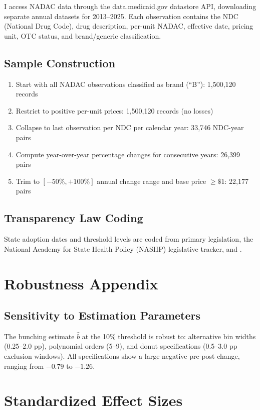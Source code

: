 \documentclass[12pt]{article}
\begin{document}
I access NADAC data through the data.medicaid.gov datastore API, downloading separate annual datasets for 2013--2025. Each observation contains the NDC (National Drug Code), drug description, per-unit NADAC, effective date, pricing unit, OTC status, and brand/generic classification.

\subsection{Sample Construction}

\begin{enumerate}
\item Start with all NADAC observations classified as brand (``B''): 1,500,120 records
\item Restrict to positive per-unit prices: 1,500,120 records (no losses)
\item Collapse to last observation per NDC per calendar year: 33,746 NDC-year pairs
\item Compute year-over-year percentage changes for consecutive years: 26,399 pairs
\item Trim to $[-50\%, +100\%]$ annual change range and base price $\geq \$1$: 22,177 pairs
\end{enumerate}

\subsection{Transparency Law Coding}

State adoption dates and threshold levels are coded from primary legislation, the National Academy for State Health Policy (NASHP) legislative tracker, and \citet{wallach2024}.

\section{Robustness Appendix}

\subsection{Sensitivity to Estimation Parameters}

The bunching estimate $\hat{b}$ at the 10\% threshold is robust to: alternative bin widths (0.25--2.0 pp), polynomial orders (5--9), and donut specifications (0.5--3.0 pp exclusion windows). All specifications show a large negative pre-post change, ranging from $-0.79$ to $-1.26$.

\section{Standardized Effect Sizes}
\label{sec:sde}


\end{document}
